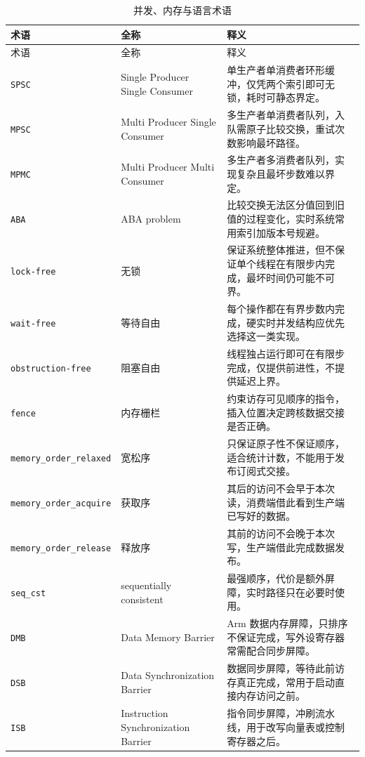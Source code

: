 \documentclass[12pt,a4paper,fontset=fandol]{ctexbook}
\newcommand{\Tp}[1]{\texttt{#1}}
\newcommand{\Bk}{\discretionary{}{}{}}
\begin{document}
\begin{longtable}{@{} >{\raggedright\arraybackslash}p{} >{\raggedright\arraybackslash}p{} >{\raggedright\arraybackslash}p{}@{}}
\caption{并发、内存与语言术语}\label{tab:apA-conc} \\
\toprule
术语 & 全称 & 释义 \\
\midrule
\endfirsthead
\toprule
术语 & 全称 & 释义 \\
\midrule
\endhead
\bottomrule
\endfoot
\endlastfoot
\Tp{SPSC} & Single Producer Single Consumer & 单生产者单消费者环形缓冲，仅凭两个索引即可无锁，耗时可静态界定。 \\
\Tp{MPSC} & Multi Producer Single Consumer & 多生产者单消费者队列，入队需原子比较交换，重试次数影响最坏路径。 \\
\Tp{MPMC} & Multi Producer Multi Consumer & 多生产者多消费者队列，实现复杂且最坏步数难以界定。 \\
\Tp{ABA} & ABA problem & 比较交换无法区分值回到旧值的过程变化，实时系统常用索引加版本号规避。 \\
\Tp{lock-free} & 无锁 & 保证系统整体推进，但不保证单个线程在有限步内完成，最坏时间仍可能不可界。 \\
\Tp{wait-free} & 等待自由 & 每个操作都在有界步数内完成，硬实时并发结构应优先选择这一类实现。 \\
\Tp{obstruction-free} & 阻塞自由 & 线程独占运行即可在有限步完成，仅提供前进性，不提供延迟上界。 \\
\Tp{fence} & 内存栅栏 & 约束访存可见顺序的指令，插入位置决定跨核数据交接是否正确。 \\
\Tp{memory\_{\Bk}order\_{\Bk}relaxed} & 宽松序 & 只保证原子性不保证顺序，适合统计计数，不能用于发布订阅式交接。 \\
\Tp{memory\_{\Bk}order\_{\Bk}acquire} & 获取序 & 其后的访问不会早于本次读，消费端借此看到生产端已写好的数据。 \\
\Tp{memory\_{\Bk}order\_{\Bk}release} & 释放序 & 其前的访问不会晚于本次写，生产端借此完成数据发布。 \\
\Tp{seq\_cst} & sequentially consistent & 最强顺序，代价是额外屏障，实时路径只在必要时使用。 \\
\Tp{DMB} & Data Memory Barrier & Arm 数据内存屏障，只排序不保证完成，写外设寄存器常需配合同步屏障。 \\
\Tp{DSB} & Data Synchronization Barrier & 数据同步屏障，等待此前访存真正完成，常用于启动直接内存访问之前。 \\
\Tp{ISB} & Instruction Synchronization Barrier & 指令同步屏障，冲刷流水线，用于改写向量表或控制寄存器之后。 \\

\end{longtable}
\end{document}

